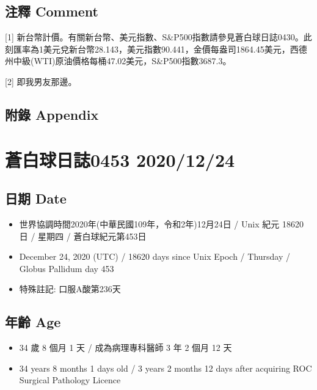 \documentclass[a5paper, 11pt
]{book}
\providecommand{\tightlist}{%
  \setlength{\itemsep}{0pt}\setlength{\parskip}{0pt}}
\begin{document}
\hypertarget{ux6ce8ux91cb-comment-22}{%
\subsection{注釋 Comment}\label{ux6ce8ux91cb-comment-22}}

{[}1{]}
新台幣計價。有關新台幣、美元指數、S\&P500指數請參見蒼白球日誌0430。此刻匯率為1美元兌新台幣28.143，美元指數90.441，金價每盎司1864.45美元，西德州中級(WTI)原油價格每桶47.02美元，S\&P500指數3687.3。

{[}2{]} 即我男友那邊。

\hypertarget{ux9644ux9304-appendix-22}{%
\subsection{附錄 Appendix}\label{ux9644ux9304-appendix-22}}

\hypertarget{ux84bcux767dux7403ux65e5ux8a8c0453-20201224}{%
\section{蒼白球日誌0453
2020/12/24}\label{ux84bcux767dux7403ux65e5ux8a8c0453-20201224}}

\hypertarget{ux65e5ux671f-date-23}{%
\subsection{日期 Date}\label{ux65e5ux671f-date-23}}

\begin{itemize}
\tightlist
\item
  世界協調時間2020年(中華民國109年，令和2年)12月24日 / Unix 紀元 18620
  日 / 星期四 / 蒼白球紀元第453日
\item
  December 24, 2020 (UTC) / 18620 days since Unix Epoch / Thursday /
  Globus Pallidum day 453
\item
  特殊註記: 口服A酸第236天
\end{itemize}

\hypertarget{ux5e74ux9f61-age-23}{%
\subsection{年齡 Age}\label{ux5e74ux9f61-age-23}}

\begin{itemize}
\tightlist
\item
  34 歲 8 個月 1 天 / 成為病理專科醫師 3 年 2 個月 12 天
\item
  34 years 8 months 1 days old / 3 years 2 months 12 days after
  acquiring ROC Surgical Pathology Licence
\end{itemize}
\end{document}
